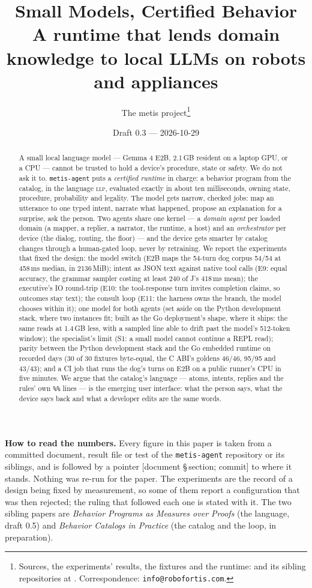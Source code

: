 \documentclass[11pt]{article}
\title{\textbf{Small Models, Certified Behavior}\\[1ex]
\large A runtime that lends domain knowledge to local LLMs on robots and appliances}
\author{The metis project\thanks{Sources, the experiments' results, the fixtures and the
runtime: \agenturl{} and its sibling repositories at \orgurl. Correspondence:
\texttt{info@robofortis.com}.}}
\date{Draft 0.3 --- 2026-10-29}
\newcommand{\llp}{\textsc{llp}}
\newcommand{\agent}{\texttt{metis-agent}}
\newcommand{\src}[1]{{\footnotesize\textsf{[#1]}}}
\begin{document}
\maketitle

\begingroup\small\noindent
\textbf{How to read the numbers.} Every figure in this paper is taken from a
committed document, result file or test of the \agent{} repository or its
siblings, and is followed by a pointer \src{document \S\,section; commit}
to where it stands. Nothing was re-run for the paper. The experiments are the
record of a design being fixed by measurement, so some of them report a
configuration that was then rejected; the ruling that followed each one is
stated with it. The two sibling papers are \emph{Behavior Programs as Measures
over Proofs} (the language, draft 0.5) and \emph{Behavior Catalogs in
Practice} (the catalog and the loop, in preparation).
\endgroup

\begin{abstract}
A small local language model --- Gemma 4 E2B, 2.1\,GB resident on a laptop
GPU, or a CPU --- cannot be trusted to hold a device's procedure, state or
safety. We do not ask it to. \agent{} puts a \emph{certified runtime} in
charge: a behavior program from the catalog, in the language \llp{}, evaluated
exactly in about ten milliseconds, owning state, procedure, probability and
legality. The model gets narrow, checked jobs: map an utterance to one typed
intent, narrate what happened, propose an explanation for a surprise, ask the
person. Two agents share one kernel --- a \emph{domain agent} per loaded domain
(a mapper, a replier, a narrator, the runtime, a host) and an
\emph{orchestrator} per device (the dialog, routing, the floor) --- and the
device gets smarter by catalog changes through a human-gated loop, never by
retraining. We report the experiments that fixed the design: the model switch
(E2B maps the 54-turn dog corpus 54/54 at 458\,ms median, in 2136\,MiB); intent
as JSON text against native tool calls (E9: equal accuracy, the grammar
sampler costing at least 240 of J's 418\,ms mean); the executive's IO round-trip
(E10: the tool-response turn invites completion claims, so outcomes stay
text); the consult loop (E11: the harness owns the branch, the model chooses
within it); one model for both agents (set aside on the Python development stack,
where two instances fit; built as the Go deployment's shape, where it ships: the same
reads at 1.4\,GB less, with a sampled line able to drift past the model's 512-token
window); the specialist's limit (S1: a small model cannot continue a REPL read);
parity between the Python development stack and the Go embedded runtime on
recorded days (30 of 30 fixtures byte-equal, the C ABI's goldens 46/46, 95/95
and 43/43); and a CI job that runs the dog's turns on E2B on a public runner's
CPU in five minutes. We argue that the catalog's language --- atoms, intents,
replies and the rules' own \texttt{\%\%} lines --- is the emerging user
interface: what the person says, what the device says back and what a developer
edits are the same words.
\end{abstract}
\end{document}
